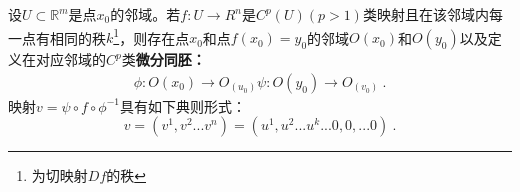 
\begin{theorem}{}
设$U\subset \mathbb R^m$是点$x_0$的邻域。若$f:U\rightarrow R^n$是$ C^p(U)(p>1)$类映射且在该邻域内每一点有相同的秩$k$\footnote{为切映射$Df$的秩}，则存在点$x_0$和点$f(x_0)=y_0$的邻域$O(x_0)$和$O(y_0)$以及定义在对应邻域的$C^p$类\textbf{微分同胚：}
\begin{equation}
\begin{aligned}
\phi:O(x_0) \rightarrow O_(u_0)
\psi:O(y_0) \rightarrow O_(v_0)~.
\end{aligned}
\end{equation}
映射$v=\psi\circ f\circ \phi^{-1}$具有如下典则形式：
\begin{equation}
v=(v^1,v^2...v^n)=(u^1,u^2...u^k...0,0,...0)~.
\end{equation}
\end{theorem}
